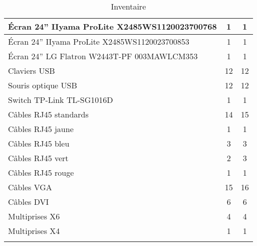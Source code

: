 \begin{center}
\begin{longtable}{|p{10cm}|c|c|}
		\hline Écran 24” IIyama ProLite X2485WS1120023700768 & 1 & 1 \\
		\hline Écran 24” IIyama ProLite X2485WS1120023700853 & 1 & 1 \\
		\hline Écran 24” LG Flatron W2443T-PF 003MAWLCM353 & 1 & 1 \\
		\hline Claviers USB & 12 & 12 \\ 
		\hline Souris optique USB & 12 & 12 \\ 
		\hline Switch TP-Link TL-SG1016D & 1 & 1 \\ 
		\hline Câbles RJ45 standards & 14 & 15 \\ 
		\hline Câbles RJ45 jaune & 1 & 1 \\ 
		\hline Câbles RJ45 bleu & 3 & 3 \\ 
		\hline Câbles RJ45 vert & 2 & 3 \\ 
		\hline Câbles RJ45 rouge & 1 & 1 \\ 
		\hline Câbles VGA & 15 & 16 \\ 
		\hline Câbles DVI & 6 & 6 \\ 
		\hline Multiprises X6 & 4 & 4 \\ 
		\hline Multiprises X4 & 1 & 1 \\
                \hline 
\caption[Inventaire]{Inventaire} \label{grid_mlmmh} \\
\end{longtable}
\end{center}

